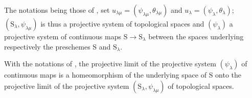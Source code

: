 \begin{env}[8.2.8]
\label{IV.8.2.8}
The notations being those of , set $u_{\lambda\mu}=(\psi_{\lambda\mu},\theta_{\lambda\mu})$ and $u_\lambda=(\psi_\lambda,\theta_\lambda)$; $(\mathrm{S}_\lambda,\psi_{\lambda\mu})$ is thus a projective system of topological spaces and $(\psi_\lambda)$ a projective system of continuous maps $\mathrm{S}\to\mathrm{S}_\lambda$ between the spaces underlying respectively the preschemes $\mathrm{S}$ and $\mathrm{S}_\lambda$.
\end{env}

\begin{proposition}[8.2.9]
\label{IV.8.2.9}
With the notations of , the projective limit of the projective system $(\psi_\lambda)$ of continuous maps is a homeomorphism of the underlying space of $\mathrm{S}$ onto the projective limit of the projective system $(\mathrm{S}_\lambda,\psi_{\lambda\mu})$ of topological spaces.
\end{proposition}

